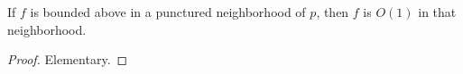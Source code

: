 \begin{theorem}
\label{BddAbove_to_IsBigO}
\leanok
If $f$ is bounded above in a punctured neighborhood of $p$, then $f$ is $O(1)$ in that
  neighborhood.
\end{theorem}
\begin{proof}
\leanok
Elementary.
\end{proof}
